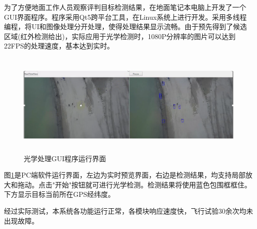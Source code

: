 为了方便地面工作人员观察评判目标检测结果，在地面笔记本电脑上开发了一个GUI界面程序。程序采用Qt5跨平台工具，在Linux系统上进行开发。采用多线程编程，将UI和图像处理分开处理，使得处理结果显示流畅。由于预先得到了候选区域(红外检测给出)，实际应用于光学检测时，1080P分辨率的图片可以达到22FPS的处理速度，基本达到实时。

\begin{figure}[h]
    \centering
    \includegraphics[height=5cm]{figures/光学处理GUI程序运行界面.png}
    \caption{光学处理GUI程序运行界面}\label{光学处理GUI程序运行界面}
\end{figure}

图\ref{光学处理GUI程序运行界面}是PC端软件运行界面，左边为实时预览界面，右边是检测结果，均支持局部放大和拖动。点击"开始"按钮就可进行光学检测。检测结果将使用蓝色包围框框住。下方显示目标当前所在GPS经纬度。

经过实际测试，本系统各功能运行正常，各模块响应速度快，飞行试验30余次均未出现故障。
